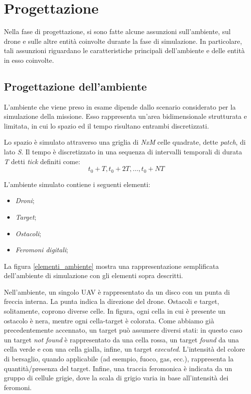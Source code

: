 \chapter{Progettazione}

Nella fase di progettazione, si sono fatte alcune assunzioni sull'ambiente, sul drone e sulle altre entità coinvolte durante la fase di simulazione.
In particolare, tali assunzioni riguardano le caratteristiche principali dell'ambiente e delle entità in esso coinvolte.

\section{Progettazione dell'ambiente}

L'ambiente che viene preso in esame dipende dallo scenario considerato per la simulazione della missione.
Esso rappresenta un'area bidimensionale strutturata e limitata, in cui lo spazio ed il tempo risultano entrambi discretizzati.

Lo spazio è simulato attraverso una griglia di \textit{NxM} celle quadrate, dette \textit{patch}, di lato \textit{S}. 
Il tempo è discretizzato in una sequenza di intervalli temporali di durata \textit{T} detti \textit{tick} definiti come:
\begin{equation*}
    t_0 + T, t_0 + 2T, \dots, t_0 + NT
\end{equation*}

L'ambiente simulato contiene i seguenti elementi: 
\begin{itemize}
    \item \textit{Droni};
    \item \textit{Target};
    \item \textit{Ostacoli};
    \item \textit{Feromoni digitali};
\end{itemize}

La figura \ref{elementi_ambiente} mostra una rappresentazione semplificata dell'ambiente di simulazione con gli elementi sopra descritti.

Nell'ambiente, un singolo UAV è rappresentato da un disco con un punta di freccia interna. 
La punta indica la direzione del drone. 
Ostacoli e target, solitamente, coprono diverse celle.
In figura, ogni cella in cui è presente un ostacolo è nera, mentre ogni cella-target è colorata. 
Come abbiamo già precedentemente accennato, un target può assumere diversi stati: in questo caso un target \textit{not found} è rappresentato da una cella rossa, un target \textit{found} da una cella verde e con una cella gialla, infine, un target \textit{executed}.
L'intensità del colore di bersaglio, quando applicabile (ad esempio, fuoco, gas, ecc.), rappresenta la quantità/presenza del target. 
Infine, una traccia feromonica è indicata da un gruppo di cellule grigie, dove la scala di grigio varia in base all'intensità dei feromoni.

